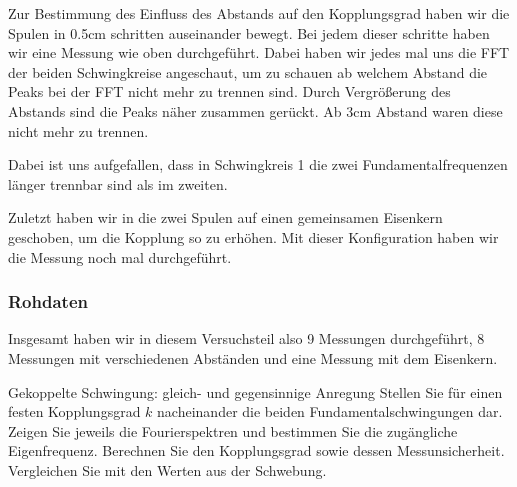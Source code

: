 \documentclass[twoside]{protokoll}
\begin{document}
Zur Bestimmung des Einfluss des Abstands auf den Kopplungsgrad haben wir die Spulen in 0.5cm schritten auseinander bewegt. 
Bei jedem dieser schritte haben wir eine Messung wie oben durchgeführt. Dabei haben wir jedes mal uns die FFT der beiden Schwingkreise angeschaut, um zu schauen ab welchem Abstand die Peaks bei der FFT nicht mehr zu trennen sind. Durch Vergrößerung des Abstands sind die Peaks näher zusammen gerückt.
Ab 3cm Abstand waren diese nicht mehr zu trennen.


Dabei ist uns aufgefallen, dass in Schwingkreis 1 die zwei Fundamentalfrequenzen länger trennbar sind als im zweiten. 

Zuletzt haben wir in die zwei Spulen auf einen gemeinsamen Eisenkern geschoben, um die Kopplung so zu erhöhen. Mit dieser Konfiguration haben wir die Messung noch mal durchgeführt. 

\subsubsection{Rohdaten}

Insgesamt haben wir in diesem Versuchsteil also 9 Messungen durchgeführt, 8 Messungen mit verschiedenen Abständen und eine Messung mit dem Eisenkern. 


\begin{aufgabe}{Gekoppelte Schwingung: gleich- und gegensinnige Anregung}
  Stellen Sie für einen festen Kopplungsgrad $k$ nacheinander die
  beiden Fundamentalschwingungen dar. Zeigen Sie jeweils die
  Fourierspektren und bestimmen Sie die zugängliche
  Eigenfrequenz. Berechnen Sie den Kopplungsgrad sowie dessen
  Messunsicherheit. Vergleichen Sie mit den Werten aus der Schwebung.
\end{aufgabe}
   
   
\end{document}
